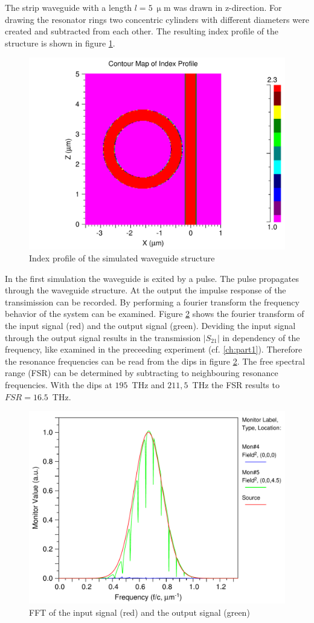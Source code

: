 The strip waveguide with a length $l=5~\upmu$m was drawn in z-direction. For drawing the resonator rings two concentric cylinders with different diameters were created and subtracted from each other. The resulting index profile of the structure is shown in figure \ref{fig:index_profile1}.

\begin{figure}
\centering
\includegraphics[width=.6\columnwidth]{Grafiken/11_index_profile.pdf}%
\caption{Index profile of the simulated waveguide structure}%
\label{fig:index_profile1}%
\end{figure}



In the first simulation the waveguide is exited by a pulse. The pulse propagates through the waveguide structure. At the output the impulse response of the transimission can be recorded. By performing a fourier transform the frequency behavior of the system can be examined. Figure \ref{fig:2_TE_FFT} shows the fourier transform of the input signal (red) and the output signal (green). Deviding the input signal through the output signal results in the transmission $\left|S_{21}\right|$ in dependency of the frequency, like examined in the preceeding experiment (cf. \ref{ch:part1}). Therefore the resonance frequencies can be read from the dips in figure \ref{fig:2_TE_FFT}. The free spectral range (FSR) can be determined by subtracting to neighbouring resonance frequencies. With the dips at  $195$~THz and $211,5$~THz the FSR results to $FSR = 16.5$~THz.


\begin{figure}
\centering
\includegraphics[width=.6\columnwidth]{Grafiken/12_TE_FFT.pdf}%
\caption{FFT of the input signal (red) and the output signal (green)}%
\label{fig:2_TE_FFT}%
\end{figure}





